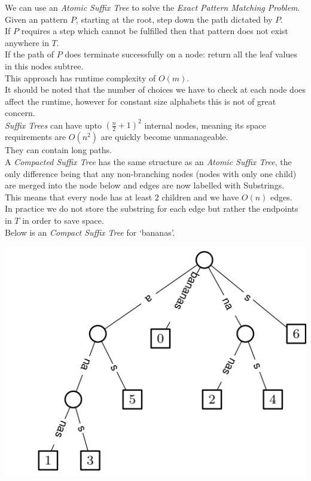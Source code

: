 \documentclass[11pt,a4paper]{article}
\begin{document}
We can use an \textit{Atomic Suffix Tree} to solve the \textit{Exact Pattern Matching Problem}.\\
Given an pattern $P$, starting at the root, step down the path dictated by $P$.\\
If $P$ requires a step which cannot be fulfilled then that pattern does not exist anywhere in $T$.\\
If the path of $P$ does terminate successfully on a node: return all the leaf values in this nodes subtree.\\

This approach has runtime complexity of $O(m)$.\\
It should be noted that the number of choices we have to check at each node does affect the runtime, however for constant size alphabets this is not of great concern.\\

\textit{Suffix Trees} can have upto $\left(\frac{n}2+1\right)^2$ internal nodes, meaning its space requirements are $O(n^2)$ are quickly become unmanageable.\\
They can contain long paths.\\

A \textit{Compacted Suffix Tree} has the same structure as an \textit{Atomic Suffix Tree}, the only difference being that any non-branching nodes (\ie nodes with only one child) are merged into the node below and edges are now labelled with Substrings.\\
This means that every node has at least $2$ children and we have $O(n)$ edges.\\
\nb In practice we do not store the substring for each edge but rather the endpoints in $T$ in order to save space.\\

Below is an \textit{Compact Suffix Tree} for `bananas'.
\begin{center}\includegraphics[scale=.5]{img/compact_suffix_tree.png}\end{center}
\end{document}
